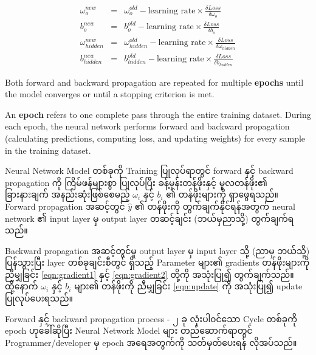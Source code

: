 \begin{itemize}[f1]
      \begin{eqnarray}\label{eqn:update}
          \omega_o^{new} &=& \omega_o^{old} - \text{learning rate} \times \frac{\delta Loss}{\delta \omega_o}\\
          b_o^{new}          &=& b_o^{old} - \text{learning rate} \times \frac{\delta Loss}{\delta b_o}\\
          \omega_{hidden}^{new} &=& \omega_{hidden}^{old} - \text{learning rate} \times \frac{\delta Loss}{\delta \omega_{hidden}}\\
          b_{hidden}^{new}          &=& b_{hidden}^{old} - \text{learning rate} \times \frac{\delta Loss}{\delta b_{hidden}}   
        \end{eqnarray}
\end{itemize}

Both forward and backward propagation are repeated for multiple \textbf{epochs} until the model converges or until a stopping criterion is met.

\begin{definition}\label{def:epoch}
An \textbf{epoch} refers to one complete pass through the entire training dataset. During each epoch, the neural network performs forward and backward propagation (calculating predictions, computing loss, and updating weights) for every sample in the training dataset.
\end{definition}

\newpage
\noindent Neural Network Model တစ်ခုကို Training ပြုလုပ်ရာတွင် forward နှင့် backward propagation ကို ကြိမ်ဖန်များစွာ ပြုလုပ်ပြီး ခန့်မှန်းတန်ဖိုးနှင့် မူလတန်ဖိုး၏ ခြားနားချက် အနည်းဆုံးဖြစ်စေမည့် $\omega_{i}$ နှင့် $b_i$ ၏ တန်ဖိုးများကို ရှာဖွေရသည်။ Forward propagation အဆင့်တွင် $\hat{y}$ ၏ တန်ဖိုးကို တွက်ချက်နိုင်ရန်အတွက်  neural network ၏ input layer မှ output layer တဆင့်ချင်း (ဘယ်မှညာသို့) တွက်ချက်ရသည်။ 

Backward propagation အဆင့်တွင်မူ output layer မှ  input layer သို့ (ညာမှ ဘယ်သို့) ပြန်သွားပြီး layer တစ်ခုချင်းစီတွင် ရှိသည့် Parameter များ၏ gradients တန်ဖိုးများကို ညီမျှခြင်း \ref{eqn:gradient1} နှင့် \ref{eqn:gradient2} တို့ကို အသုံးပြု၍ တွက်ချက်သည်။ ထို့နောက် $\omega_{i}$ နှင့် $b_i$ များ၏ တန်ဖိုးကို ညီမျှခြင်း \ref{eqn:update} ကို အသုံးပြု၍ update ပြုလုပ်ပေးရသည်။ 

Forward နှင့် backward propagation process - ၂ ခု လုံးပါ၀င်သော Cycle တစ်ခုကို epoch ဟုခေါ်ဆိုပြီး Neural Network Model များ တည်ဆောက်ရာတွင် Programmer/developer မှ epoch အရေအတွက်ကို သတ်မှတ်ပေးရန် လိုအပ်သည်။ 

